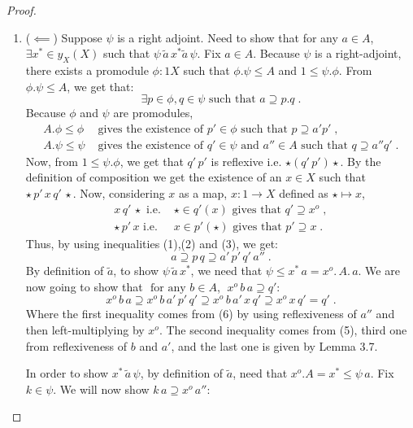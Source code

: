 \documentclass[a4paper]{article}
\makeatletter
\theoremstyle{definition}
\newcommand{\carrow}{}%
\DeclareRobustCommand{\carrow}{%
	\mathrel{\vphantom{\rightarrow}\mathpalette\circle@arrow\relax}%
}
\newcommand{\circle@arrow}[2]{%
	\m@th
	\ooalign{%
		\hidewidth$#1\circ\mkern1mu$\hidewidth\cr
	$#1\longrightarrow$\cr}%
}
\makeatother
\begin{document}
\begin{proof}
\begin{enumerate}[label=(\roman*)]
				\item ($\impliedby$) Suppose $\psi$ is a right adjoint. Need to show that for any
					$a \in A$, $\exists x^* \in y_X(X)$ such that $\psi \, \tilde{a} \,x^*
					\tilde{a} \, \psi$. Fix $a \in A$. Because $\psi$ is a right-adjoint, there
					exists a promodule $\phi: 1 \carrow X$ such that $\phi.\psi \leq A$ and
					$1\leq \psi.\phi$. From $\phi.\psi \leq A$, we get that:
					\begin{equation}\exists p \in \phi, q \in \psi \text{ such that }
						a \supseteq p.q \; .
					\end{equation}
					Because $\phi$ and $\psi$ are promodules,
					\begin{align}
						A.\phi \leq \phi & \text{ gives the existence of } p' \in \phi \text{ such that } p\supseteq a'p'  \; ,\\
						A.\psi \leq \psi & \text{ gives the existence of } q' \in \psi \text{ and } a'' \in A
						\text{ such that } q \supseteq a''q' \; .
					\end{align}
					Now, from $1 \leq \psi.\phi$, we get that $q'\,p'$ is reflexive i.e. $\star (q' \,p')
					\star$. By the definition of composition we get the existence of an $x \in X$
					such that $\star \, p' \, x \,q'\,\star$. Now, considering $x$ as a map, $x:1 \to X$
					defined as $\star \mapsto x$,
					\begin{align}
						x \, q' \, \star \text{ i.e. } &\star \in q'(x) \text{ gives that }
						q' \supseteq x^o \;,\\
						\star \,p' \, x \text{ i.e. } &x \in p'(\star) \text{ gives that }
						p'\supseteq x \;.
					\end{align}
					Thus, by using inequalities (1),(2) and (3), we get:
					\begin{equation}
						a \supseteq p\,q \supseteq a'\,p'\,q'\,a'' \; .
					\end{equation}
					By definition of $\tilde{a}$, to show $\psi \, \tilde{a} \, x^*$,
					we need that $\psi \leq x^*\,a=x^o.\,A.\,a$. We are now
					going to show that
					$\text{ for any } b\in A$, $\;  x^o\,b\,a \supseteq q'$:
					\[ x^o\,b\,a \supseteq x^o\,b\,a'\,p'\,q' \supseteq x^o\,b\,a'\,x\,q'
					\supseteq x^o\,x\,q' = q' \; .\]
					Where the first inequality comes from (6) by using reflexiveness of $a''$ and then
					left-multiplying by $x^o$. The second inequality comes from (5),
					third one from reflexiveness of $b$ and $a'$,
					and the last one is given by Lemma 3.7.

					In order to show $x^* \, \tilde{a} \, \psi$, by definition of $\tilde{a}$,
					need that $x^o.A=x^* \leq \psi\,a$. Fix $k\in \psi$. We will now show
					$k\,a \supseteq x^o \, a''$:


\end{enumerate}
\end{proof}
\end{document}
